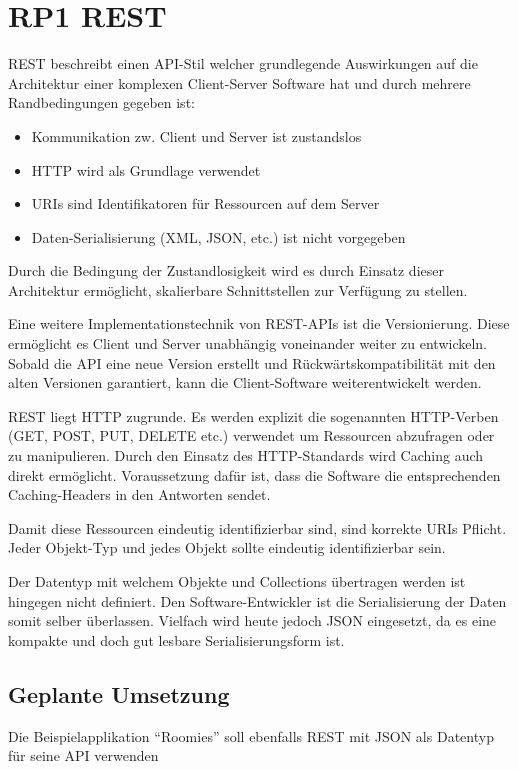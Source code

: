 \section{RP1 REST}
\label{sec:principle-rp1-rest}

\gls{REST} beschreibt einen API-Stil welcher grundlegende Auswirkungen auf die Architektur einer komplexen Client-Server Software hat und durch mehrere Randbedingungen gegeben ist:
\begin{itemize}
	\item Kommunikation zw. Client und Server ist zustandslos
	\item HTTP wird als Grundlage verwendet
	\item \glspl{URI} sind Identifikatoren für Ressourcen auf dem Server
	\item Daten-Serialisierung (XML, JSON, etc.) ist nicht vorgegeben
\end{itemize}

Durch die Bedingung der Zustandlosigkeit wird es durch Einsatz dieser Architektur ermöglicht, skalierbare Schnittstellen zur Verfügung zu stellen.

Eine weitere Implementationstechnik von REST-APIs ist die Versionierung. Diese ermöglicht es Client und Server unabhängig voneinander weiter zu entwickeln.
Sobald die API eine neue Version erstellt und Rückwärtskompatibilität mit den alten Versionen garantiert, kann die Client-Software weiterentwickelt werden.

REST liegt HTTP zugrunde. Es werden explizit die sogenannten HTTP-Verben (GET, POST, PUT, DELETE etc.) verwendet um Ressourcen abzufragen oder zu manipulieren.
Durch den Einsatz des HTTP-Standards wird Caching auch direkt ermöglicht. Voraussetzung dafür ist, dass die Software die entsprechenden Caching-Headers in den Antworten sendet.

Damit diese Ressourcen eindeutig identifizierbar sind, sind korrekte \glspl{URI} Pflicht. Jeder Objekt-Typ und jedes Objekt sollte eindeutig identifizierbar sein.

Der Datentyp mit welchem Objekte und Collections übertragen werden ist hingegen nicht definiert. Den Software-Entwickler ist die Serialisierung der Daten somit selber überlassen.
Vielfach wird heute jedoch \gls{JSON} eingesetzt, da es eine kompakte und doch gut lesbare Serialisierungsform ist.


\subsection*{Geplante Umsetzung}
Die Beispielapplikation ``Roomies'' soll ebenfalls REST mit JSON als Datentyp für seine API verwenden

